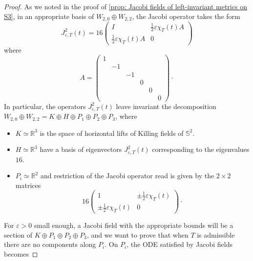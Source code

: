 \documentclass{article}
\numberwithin{equation}{section}        %
\theoremstyle{bfnote}
\theoremstyle{definition}
\theoremstyle{bfremark}
\newcommand{\R}{\mathbb{R}}                 %
\newcommand{\Sp}{\mathbb{S}}                %
\begin{document}
\begin{proof}
    As we noted in the proof of \cref{prop: Jacobi fields of left-invariant metrics on S3}, in an appropriate basis of $W_{2,0} \oplus W_{2,2}$, the Jacobi operator takes the form
    \begin{equation*}
        J^2_{\varepsilon,T}(t) = 16 \begin{pmatrix}
            I & \frac{1}{2} \varepsilon \chi_T(t) A \\
        \frac{1}{2} \varepsilon \chi_T(t) A & 0
        \end{pmatrix}
    \end{equation*}
    where
    \begin{equation*}
        A = \begin{pmatrix}
            1  \\
            & -1  \\
            & & -1   \\
            & & & 0 \\
            & & & & 0 \\
            & & & & & 0
        \end{pmatrix} \cdot
    \end{equation*}
    In particular, the operators $J^2_{\varepsilon,T}(t)$ leave invariant the decomposition $W_{2,0} \oplus W_{2,2} = K \oplus H \oplus P_1 \oplus P_2 \oplus P_3$, where
    \begin{itemize}
        \item $K \simeq \R^3$ is the space of horizontal lifts of Killing fields of $\Sp^2$.
        \item $H \simeq \R^3$ have a basis of eigenvectors $J^2_{\varepsilon,T}(t)$ corresponding to the eigenvalues $16$.
        \item $P_i \simeq \R^2$ and restriction of the Jacobi operator read is given by the $2 \times 2$ matrices
        \begin{equation*}
            16\begin{pmatrix}
                1 & \pm \frac{1}{2} \varepsilon \chi_T(t) \\
                \pm \frac{1}{2} \varepsilon \chi_T(t) & 0
            \end{pmatrix} \cdot
        \end{equation*}
    \end{itemize}
    For $\varepsilon > 0$ small enough, a Jacobi field with the appropriate bounds will be a section of $K \oplus P_1 \oplus P_2 \oplus P_3$, and we want to prove that when $T$ is admissible there are no components along $P_i$. On $P_i$, the ODE satisfied by Jacobi fields becomes

\end{proof}
\end{document}
